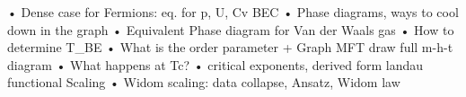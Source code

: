 \documentclass{article}%
\begin{document}
\begin{enumerate}
\begin{mycolorbox}
 • Dense case for Fermions: eq. for p, U, Cv\newline%
 BEC\newline%
 • Phase diagrams, ways to cool down in the graph\newline%
 • Equivalent Phase diagram for Van der Waals gas\newline%
 • How to determine T\_BE\newline%
 • What is the order parameter + Graph\newline%
 MFT\newline%
 draw full m{-}h{-}t diagram\newline%
 • What happens at Tc?\newline%
 • critical exponents, derived form landau functional\newline%
 Scaling\newline%
 • Widom scaling: data collapse, Ansatz, Widom law%
\end{mycolorbox}%
\end{enumerate}%
\newpage%
\end{document}
